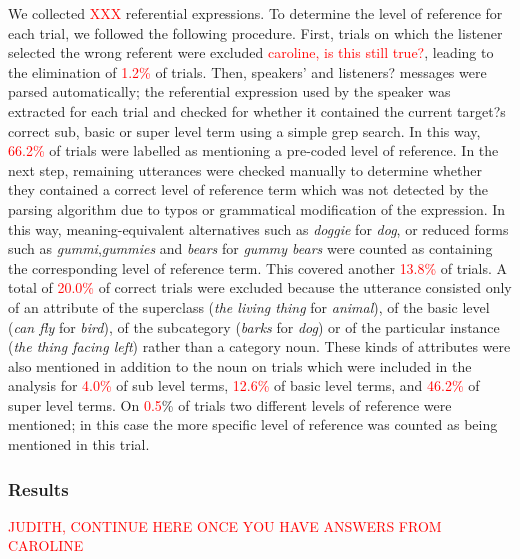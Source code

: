 \documentclass[11pt]{article}
\newcommand{\red}[1]{\textcolor{Red}{#1}}
\begin{document}
We collected \red{XXX} referential expressions. To determine the level of reference for each trial, we followed the following procedure. First, trials on which the listener selected the wrong referent were excluded \red{caroline, is this still true?}, leading to the elimination of \red{1.2\%} of trials. Then, speakers' and listeners? messages were parsed automatically; the referential expression used by the speaker was extracted for each trial and checked for whether it contained the current target?s correct sub, basic or super level term using a simple grep search. In this way, \red{66.2\%} of trials were labelled as mentioning a pre-coded level of reference. In the next step, remaining utterances were checked manually to determine whether they contained a correct level of reference term which was not detected by the parsing algorithm due to typos or grammatical modification of the expression. In this way, meaning-equivalent alternatives such as \emph{doggie} for \emph{dog}, or reduced forms such as \emph{gummi},\emph{gummies} and \emph{bears} for \emph{gummy bears} were counted as containing the corresponding level of reference term. This covered another \red{13.8\%} of trials. A total of \red{20.0\%} of correct trials were excluded because the utterance consisted only of an attribute of the superclass (\emph{the living thing} for \emph{animal}), of the basic level (\emph{can fly} for \emph{bird}), of the subcategory (\emph{barks} for \emph{dog}) or of the particular instance (\emph{the thing facing left}) rather than a category noun. These kinds of attributes were also mentioned in addition to the noun on trials which were included in the analysis for \red{4.0\%} of sub level terms, \red{12.6\%} of basic level terms, and \red{46.2\%} of super level terms. On \red{0.5}\% of trials two different levels of reference were mentioned; in this case the more specific level of reference was counted as being mentioned in this trial.

\subsubsection{Results}

\red{JUDITH, CONTINUE HERE ONCE YOU HAVE ANSWERS FROM CAROLINE}
\end{document}
